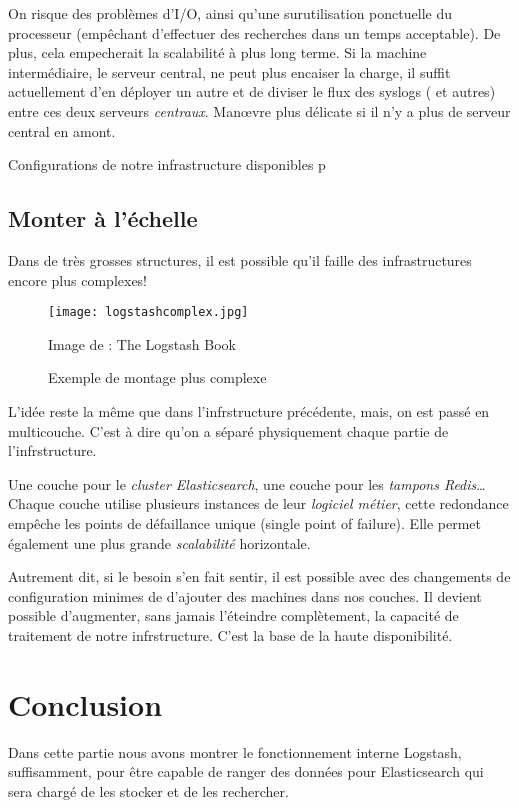 On risque des problèmes d'I/O, ainsi qu'une surutilisation ponctuelle du processeur
(empêchant d'effectuer des recherches dans un temps acceptable).
De plus, cela empecherait la scalabilité à plus long terme. 
Si la machine intermédiaire, le serveur central, ne peut plus encaiser la charge, 
il suffit actuellement d'en déployer un autre et de diviser le flux des syslogs (
et autres) entre ces deux serveurs \textit{centraux}. Manœvre plus délicate si 
il n'y a plus de serveur central en amont.

Configurations de notre infrastructure disponibles p\pageref{sec:codeprod}


\subsection{Monter à l'échelle}
Dans de très grosses structures, il est possible qu'il faille des infrastructures
encore plus complexes!

\begin{figure}[H]
\center
\texttt{[image: logstashcomplex.jpg]}
\label{fig:logstashcomplex}
\caption{Exemple de montage plus complexe}
{\footnotesize Image de : The Logstash Book}
\end{figure}

L'idée reste la même que dans l'infrstructure précédente, mais, on est passé en multicouche.
C'est à dire qu'on a séparé physiquement chaque partie de l'infrstructure. 

Une couche pour le \textit{cluster Elasticsearch}, une couche pour les \textit{tampons Redis}\ldots
Chaque couche utilise plusieurs instances de leur \textit{logiciel métier}, cette redondance empêche les
points de défaillance unique (single point of failure). Elle permet également une
plus grande \textit{scalabilité} horizontale. 

Autrement dit, si le besoin s'en fait
sentir, il est possible avec des changements de configuration minimes de d'ajouter
des machines dans nos couches. Il devient possible d'augmenter, sans jamais l'éteindre
complètement, la capacité de traitement de notre infrstructure. C'est la base de la
haute disponibilité.


\section{Conclusion}
Dans cette partie nous avons montrer le fonctionnement interne Logstash, suffisamment, 
pour être capable de ranger des données pour Elasticsearch qui sera chargé de les stocker
et de les rechercher.


